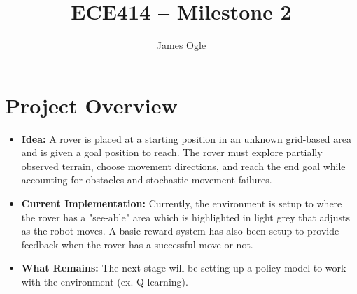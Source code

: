 \documentclass[12pt]{article}
\author{James Ogle}
\title{ECE414 -- Milestone 2}
\begin{document}
\maketitle
{}
\section*{Project Overview}
\begin{itemize}
    \item \textbf{Idea:} A rover is placed at a starting position in an unknown grid-based area and is given a goal position to reach.
    The rover must explore partially observed terrain, choose movement directions, and reach the end goal while accounting for obstacles and stochastic movement failures.

    \item \textbf{Current Implementation:} Currently, the environment is setup to where the rover has a "see-able" area which is highlighted in light grey that adjusts as the robot moves.
    A basic reward system has also been setup to provide feedback when the rover has a successful move or not.

    \item \textbf{What Remains:} The next stage will be setting up a policy model to work with the environment (ex. Q-learning).
\end{itemize}
\end{document}
